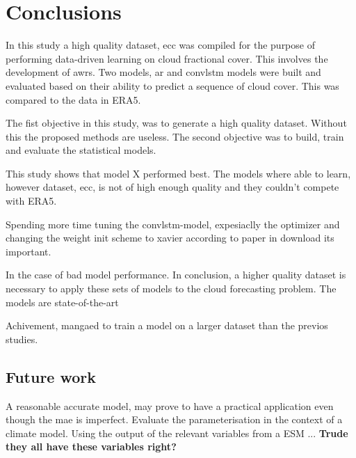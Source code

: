\chapter{Conclusions}
In this study a high quality dataset, \acrfull{ecc} was compiled for the purpose of performing data-driven learning on cloud fractional cover. This involves the development of \acrfull{awrs}. %
Two models, \acrfull{ar} and \acrfull{convlstm} models were built and evaluated based on their ability to predict a sequence of cloud cover. This was compared to the data in ERA5. 

The fist objective in this study, was to generate a high quality dataset. Without this the proposed methods are useless. The second objective was to build, train and evaluate the statistical models. 

This study shows that model X performed best. The models where able to learn, however dataset, \acrshort{ecc}, is not of high enough quality and they couldn't compete with ERA5.

Spending more time tuning the \acrshort{convlstm}-model, expesiaclly the optimizer and changing the weight init scheme to xavier according to paper in download its important. 

In the case of bad model performance. In conclusion, a higher quality dataset is necessary to apply these sets of models to the cloud forecasting problem. The models are state-of-the-art 

Achivement, mangaed to train a model on a larger dataset than the previos studies.

\section{Future work}
A reasonable accurate model, may prove to have a practical application even though the \acrshort{mae} is imperfect. Evaluate the parameterisation in the context of a climate model. Using the output of the relevant variables from a \acrshort{ESM} ... \textbf{Trude they all have these variables right?}

